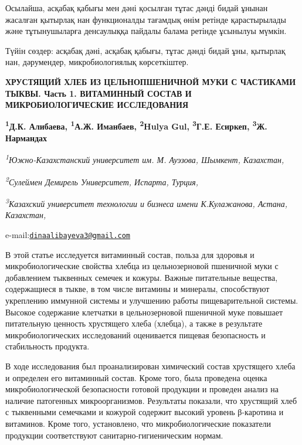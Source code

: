 Осылайша, асқабақ қабығы мен дәні қосылған тұтас дәнді бидай ұнынан
жасалған қытырлақ нан функционалды тағамдық өнім ретінде қарастырылады
және тұтынушыларға денсаулыққа пайдалы балама ретінде ұсынылуы мүмкін.

Түйін сөздер: асқабақ дәні, асқабақ қабығы, тұтас дәнді бидай ұны,
қытырлақ нан, дәрумендер, микробиологиялық көрсеткіштер.

\begin{articleheader}
{\bfseries ХРУСТЯЩИЙ ХЛЕБ ИЗ ЦЕЛЬНОПШЕНИЧНОЙ МУКИ С ЧАСТИКАМИ ТЫКВЫ. Часть 1. ВИТАМИННЫЙ СОСТАВ И МИКРОБИОЛОГИЧЕСКИЕ ИССЛЕДОВАНИЯ}

{\bfseries
\textsuperscript{1}Д.К. Алибаева\textsuperscript{\envelope },
\textsuperscript{1}А.Ж. Иманбаев,
\textsuperscript{2}Hulya Gul,
\textsuperscript{3}Г.Е. Есиркеп,
\textsuperscript{3}Ж. Нармандах}
\end{articleheader}

\begin{affiliation}
\emph{\textsuperscript{1}Южно-Казахстанский университет им. М. Ауэзова, Шымкент, Казахстан,}

\emph{\textsuperscript{2}Сулеймен Демирель Университет, Испарта, Турция,}

\emph{\textsuperscript{3}Казахский университет технологии и бизнеса имени К.Кулажанова, Астана, Казахстан,}

e-mail:\href{mailto:dinaalibayeva3@gmail.com}{\nolinkurl{dinaalibayeva3@gmail.com}}
\end{affiliation}

В этой статье исследуется витаминный состав, польза для здоровья и
микробиологические свойства хлебца из цельнозерновой пшеничной муки с
добавлением тыквенных семечек и кожуры. Важные питательные вещества,
содержащиеся в тыкве, в том числе витамины и минералы, способствуют
укреплению иммунной системы и улучшению работы пищеварительной системы.
Высокое содержание клетчатки в цельнозерновой пшеничной муке повышает
питательную ценность хрустящего хлеба (хлебца), а также в результате
микробиологических исследований оценивается пищевая безопасность и
стабильность продукта.

В ходе исследования был проанализирован химический состав хрустящего
хлеба и определен его витаминный состав. Кроме того, была проведена
оценка микробиологической безопасности готовой продукции и проведен
анализ на наличие патогенных микроорганизмов. Результаты показали, что
хрустящий хлеб с тыквенными семечками и кожурой содержит высокий уровень
β-каротина и витаминов. Кроме того, установлено, что микробиологические
показатели продукции соответствуют санитарно-гигиеническим нормам.

